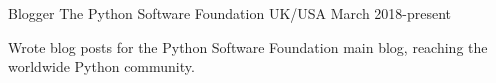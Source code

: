 


\begin{cventries}



\cventry
{Blogger} %
{The Python Software Foundation } %
{UK/USA} %
{March 2018-present } %
{ %
\begin{cvitems}
\item {Wrote blog posts for the Python Software Foundation main blog, reaching the worldwide Python community.}
\end{cvitems}
}







\end{cventries}
